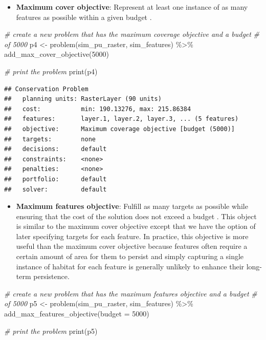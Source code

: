 \documentclass[
  12pt,
]{book}
\newenvironment{Shaded}{\begin{snugshade}}{\end{snugshade}}
\newcommand{\AttributeTok}[1]{\textcolor[rgb]{0.77,0.63,0.00}{#1}}
\newcommand{\CommentTok}[1]{\textcolor[rgb]{0.56,0.35,0.01}{\textit{#1}}}
\newcommand{\DecValTok}[1]{\textcolor[rgb]{0.00,0.00,0.81}{#1}}
\newcommand{\FunctionTok}[1]{\textcolor[rgb]{0.00,0.00,0.00}{#1}}
\newcommand{\NormalTok}[1]{#1}
\newcommand{\OtherTok}[1]{\textcolor[rgb]{0.56,0.35,0.01}{#1}}
\newcommand{\SpecialCharTok}[1]{\textcolor[rgb]{0.00,0.00,0.00}{#1}}
\providecommand{\tightlist}{%
  \setlength{\itemsep}{0pt}\setlength{\parskip}{0pt}}
\begin{document}
\begin{itemize}
\tightlist
\item
  \textbf{Maximum cover objective}: Represent at least one instance of as many features as possible within a given budget \citep{r12}.
\end{itemize}

\begin{Shaded}
\begin{Highlighting}[]
\CommentTok{\# create a new problem that has the maximum coverage objective and a budget}
\CommentTok{\# of 5000}
\NormalTok{p4 }\OtherTok{\textless{}{-}} \FunctionTok{problem}\NormalTok{(sim\_pu\_raster, sim\_features) }\SpecialCharTok{\%\textgreater{}\%}
  \FunctionTok{add\_max\_cover\_objective}\NormalTok{(}\DecValTok{5000}\NormalTok{)}

\CommentTok{\# print the problem}
\FunctionTok{print}\NormalTok{(p4)}
\end{Highlighting}
\end{Shaded}

\begin{verbatim}
## Conservation Problem
##   planning units: RasterLayer (90 units)
##   cost:           min: 190.13276, max: 215.86384
##   features:       layer.1, layer.2, layer.3, ... (5 features)
##   objective:      Maximum coverage objective [budget (5000)]
##   targets:        none
##   decisions:      default
##   constraints:    <none>
##   penalties:      <none>
##   portfolio:      default
##   solver:         default
\end{verbatim}

\begin{itemize}
\tightlist
\item
  \textbf{Maximum features objective}: Fulfill as many targets as possible while ensuring that the cost of the solution does not exceed a budget \citep[inspired by][]{r10}. This object is similar to the maximum cover objective except that we have the option of later specifying targets for each feature. In practice, this objective is more useful than the maximum cover objective because features often require a certain amount of area for them to persist and simply capturing a single instance of habitat for each feature is generally unlikely to enhance their long-term persistence.
\end{itemize}

\begin{Shaded}
\begin{Highlighting}[]
\CommentTok{\# create a new problem that has the maximum features objective and a budget}
\CommentTok{\# of 5000}
\NormalTok{p5 }\OtherTok{\textless{}{-}} \FunctionTok{problem}\NormalTok{(sim\_pu\_raster, sim\_features) }\SpecialCharTok{\%\textgreater{}\%}
  \FunctionTok{add\_max\_features\_objective}\NormalTok{(}\AttributeTok{budget =} \DecValTok{5000}\NormalTok{)}

\CommentTok{\# print the problem}
\FunctionTok{print}\NormalTok{(p5)}
\end{Highlighting}
\end{Shaded}
\end{document}

